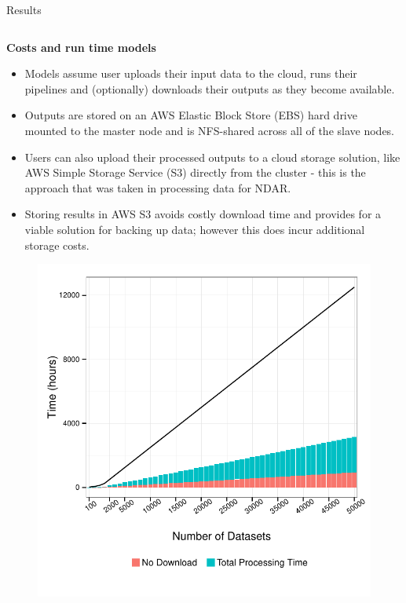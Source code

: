 \documentclass[final,hyperref={pdfpagelabels=false}]{beamer}
\begin{document}
\begin{frame}
\begin{columns}
\begin{column}{.5\textwidth}
{\begin{block}{Results}
\begin{column}{.47\textwidth}
\begin{itemize}
              \end{itemize}
              \end{column}
          \begin{column}{.47\textwidth}
              {\bf Costs and run time models}
              \begin{itemize}
                  \item Models assume user uploads their input data to the cloud, runs their pipelines and (optionally) downloads their outputs as they become available.
                  \item Outputs are stored on an AWS Elastic Block Store (EBS) hard drive mounted to the master node and is NFS-shared across all of the slave nodes.
                  \item Users can also upload their processed outputs to a cloud storage solution, like AWS Simple Storage Service (S3) directly from the cluster - this is the approach that was taken in processing data for NDAR.
                  \item Storing results in AWS S3 avoids costly download time and provides for a viable solution for backing up data; however this does incur additional storage costs.
              \end{itemize}
              \begin{figure}
                  \includegraphics[width=.99\textwidth]{cpac-times.pdf}

\end{figure}
\end{column}
\end{block}}
\end{column}
\end{columns}
\end{frame}
\end{document}
